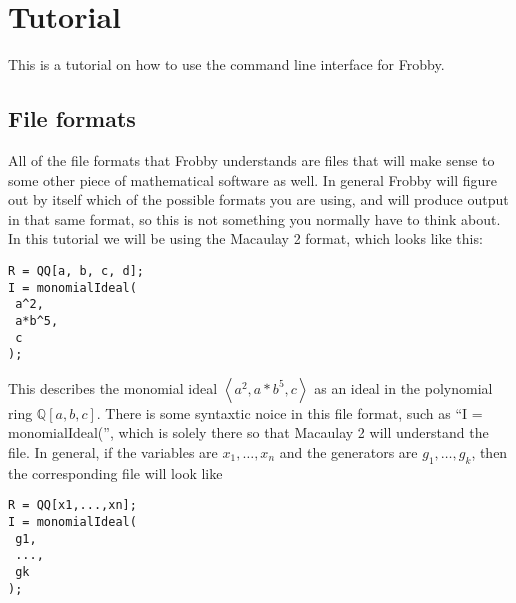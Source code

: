 \documentclass{amsart}
\theoremstyle{definition}
\newcommand{\Q}{\mathbb{Q}}
\newcommand{\ideal}[1]{\left<#1\right>}
\begin{document}
\section{Tutorial}

This is a tutorial on how to use the command line interface for
Frobby.

\subsection{File formats}

All of the file formats that Frobby understands are files that will
make sense to some other piece of mathematical software as well. In
general Frobby will figure out by itself which of the possible formats
you are using, and will produce output in that same format, so this is
not something you normally have to think about. In this tutorial we
will be using the Macaulay 2 format, which looks like this:
\begin{verbatim}
R = QQ[a, b, c, d];
I = monomialIdeal(
 a^2,
 a*b^5,
 c
);
\end{verbatim}
This describes the monomial ideal $\ideal{a^2,a*b^5,c}$ as an ideal in
the polynomial ring $\Q[a,b,c]$. There is some syntaxtic noice in this
file format, such as ``I = monomialIdeal('', which is solely there so
that Macaulay 2 will understand the file. In general, if the variables
are $x_1,\ldots,x_n$ and the generators are $g_1,\ldots,g_k$, then the
corresponding file will look like
\begin{verbatim}
R = QQ[x1,...,xn];
I = monomialIdeal(
 g1,
 ...,
 gk
);
\end{verbatim}
\end{document}

